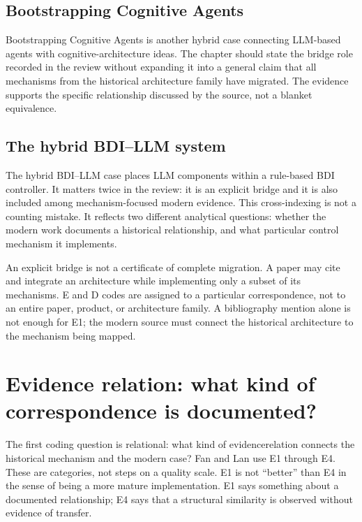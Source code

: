 \subsection{Bootstrapping Cognitive Agents}

Bootstrapping Cognitive Agents is another hybrid case connecting LLM-based agents with cognitive-architecture ideas. The chapter should state the bridge role recorded in the review without expanding it into a general claim that all mechanisms from the historical architecture family have migrated. The evidence supports the specific relationship discussed by the source, not a blanket equivalence.

\subsection{The hybrid BDI--LLM system}

The hybrid BDI--LLM case places LLM components within a rule-based BDI controller. It matters twice in the review: it is an explicit bridge and it is also included among mechanism-focused modern evidence. This cross-indexing is not a counting mistake. It reflects two different analytical questions: whether the modern work documents a historical relationship, and what particular control mechanism it implements.

\begin{notebox}
An explicit bridge is not a certificate of complete migration. A paper may cite and integrate an architecture while implementing only a subset of its mechanisms. E and D codes are assigned to a particular correspondence, not to an entire paper, product, or architecture family. A bibliography mention alone is not enough for E1; the modern source must connect the historical architecture to the mechanism being mapped.
\end{notebox}

\section{Evidence relation: what kind of correspondence is documented?}
\label{sec:ch11-evidence-relation}

The first coding question is relational: what kind of \gls{evidencerelation} connects the historical mechanism and the modern case? Fan and Lan use E1 through E4. These are categories, not steps on a quality scale. E1 is not ``better'' than E4 in the sense of being a more mature implementation. E1 says something about a documented relationship; E4 says that a structural similarity is observed without evidence of transfer.

